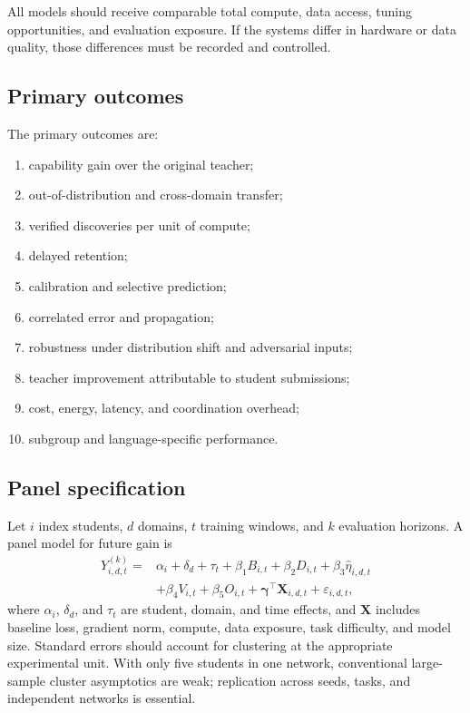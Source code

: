 \documentclass[11pt,a4paper]{article}
\begin{document}
All models should receive comparable total compute, data access, tuning opportunities, and evaluation exposure. If the systems differ in hardware or data quality, those differences must be recorded and controlled.

\subsection{Primary outcomes}

The primary outcomes are:
\begin{enumerate}
\item capability gain over the original teacher;
\item out-of-distribution and cross-domain transfer;
\item verified discoveries per unit of compute;
\item delayed retention;
\item calibration and selective prediction;
\item correlated error and propagation;
\item robustness under distribution shift and adversarial inputs;
\item teacher improvement attributable to student submissions;
\item cost, energy, latency, and coordination overhead;
\item subgroup and language-specific performance.
\end{enumerate}

\subsection{Panel specification}

Let \(i\) index students, \(d\) domains, \(t\) training windows, and \(k\) evaluation horizons. A panel model for future gain is
\begin{align}
Y_{i,d,t}^{(k)}
={}&\alpha_i+\delta_d+\tau_t
+\beta_1 B_{i,t}
+\beta_2 D_{i,t}
+\beta_3\widehat\eta_{i,d,t}\\
&+\beta_4 V_{i,t}
+\beta_5 O_{i,t}
+\boldsymbol{\gamma}^{\top}\mathbf X_{i,d,t}
+\varepsilon_{i,d,t},
\end{align}
where \(\alpha_i\), \(\delta_d\), and \(\tau_t\) are student, domain, and time effects, and \(\mathbf X\) includes baseline loss, gradient norm, compute, data exposure, task difficulty, and model size. Standard errors should account for clustering at the appropriate experimental unit. With only five students in one network, conventional large-sample cluster asymptotics are weak; replication across seeds, tasks, and independent networks is essential.
\end{document}

